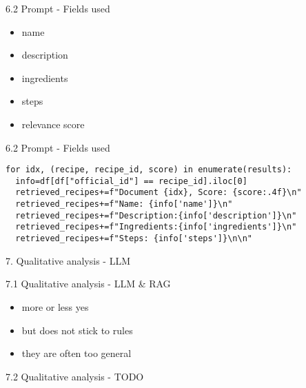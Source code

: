 \documentclass{beamer}
\begin{document}
\begin{frame}{6.2 Prompt - Fields used}
  \begin{itemize}
    \item name
    \item description
    \item ingredients
    \item steps
    \item relevance score
  \end{itemize}
\end{frame}

\begin{frame}[fragile]{6.2 Prompt - Fields used}
\begin{verbatim}
for idx, (recipe, recipe_id, score) in enumerate(results):
  info=df[df["official_id"] == recipe_id].iloc[0]
  retrieved_recipes+=f"Document {idx}, Score: {score:.4f}\n"
  retrieved_recipes+=f"Name: {info['name']}\n"
  retrieved_recipes+=f"Description:{info['description']}\n"
  retrieved_recipes+=f"Ingredients:{info['ingredients']}\n"
  retrieved_recipes+=f"Steps: {info['steps']}\n\n"
\end{verbatim}
\end{frame}

\begin{frame}{7. Qualitative analysis - LLM}
\end{frame}

\begin{frame}{7.1 Qualitative analysis - LLM \& RAG}
  \begin{itemize}
    \item more or less yes
    \item but does not stick to rules
    \item they are often too general
  \end{itemize}
\end{frame}

\begin{frame}{7.2 Qualitative analysis - TODO}
\end{frame}
\end{document}
